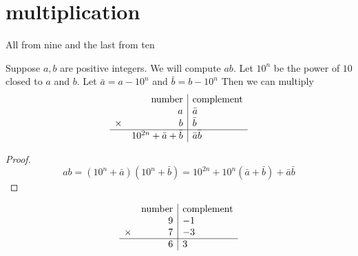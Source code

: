 \documentclass[10pt]{scrartcl}
\begin{document}
\section{multiplication}
\epigraph{All from nine and the last from ten}{}
\begin{theorem}
  Suppose $a,b$ are positive integers. We will compute $ab$. Let $10^n$ be the power of $10$ closed to $a$ and $b$. 
  Let $\bar a = a-10^n$ and $\bar b = b-10^n$
  Then we can multiply 
  \[
  \begin{array}{rr|l}
    &\textrm{number} & \textrm{complement} \\
    & a & \bar a \\
    \times & b & \bar b\\
    \hline
    &10^{2n}+\bar a+\bar b&\bar a\bar b
  \end{array}
  \]
\end{theorem}
\begin{proof}
  \[
  ab=(10^n+\bar a)(10^n+\bar b)=10^{2n}+10^n(\bar a +\bar b) + \bar a\bar b
  \]
\end{proof}
\begin{example}[$9\times 7$]
  \[
  \begin{array}{rr|l}
    &\textrm{number} & \textrm{complement} \\
    &9 & -1 \\
    \times &7 & -3\\
    \hline
    &6 & 3
  \end{array}
  \]
\end{example}
\end{document}
